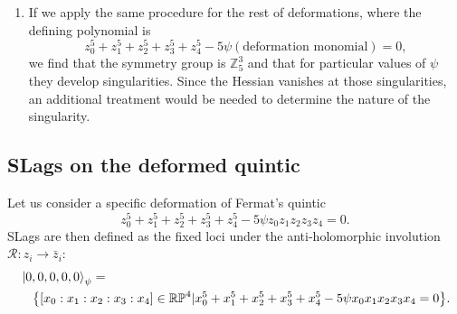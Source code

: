 \begin{enumerate}
  \item  If we apply the same procedure for the rest of deformations, where the defining polynomial is
    \begin{equation}
      z_0^5+z_1^5+z_2^5+z_3^5+z_4^5 - 5\psi(\text{deformation monomial})=0,
    \end{equation}
    we find that the symmetry group is $\mathbb Z_5^3$ and
    that for particular values of $\psi$ they develop singularities.
    Since the Hessian vanishes at those singularities, an additional treatment would be needed to determine the nature of the singularity.
%
%
%
%
%
%
%
%
%
%
%
%
\end{enumerate}

\subsection{SLags on the deformed quintic}
Let us consider a specific deformation of Fermat's quintic
\begin{equation}
  z_0^5+z_1^5+z_2^5+z_3^5+z_4^5- 5\psi z_0z_1z_2z_3z_4=0.
\end{equation}
SLags are then defined as the fixed loci under the anti-holomorphic involution $\mathcal R: z_i \to \bar z_i$:
\begin{align}
  &\ket{0,0,0,0,0}_\psi= \nonumber \\
  &\quad\qty{\qty[x_0:x_1:x_2:x_3:x_4]\in  \mathbb{RP}^4| x_0^5+x_1^5+x_2^5+x_3^5+x_4^5-5\psi x_0x_1x_2x_3x_4=0}.
\end{align}

